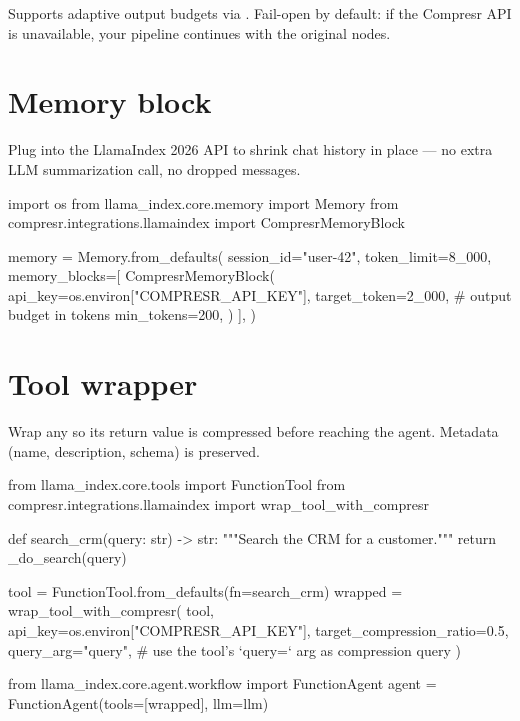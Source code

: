 \documentclass[10pt]{article}
\begin{document}
Supports adaptive output budgets via .
Fail-open by default: if the Compresr API is unavailable, your pipeline
continues with the original nodes.

\section{Memory block}

Plug  into the LlamaIndex 2026
 API to shrink chat history in place — no extra LLM
summarization call, no dropped messages.

\begin{pycode}
import os
from llama_index.core.memory import Memory
from compresr.integrations.llamaindex import CompresrMemoryBlock

memory = Memory.from_defaults(
    session_id="user-42",
    token_limit=8_000,
    memory_blocks=[
        CompresrMemoryBlock(
            api_key=os.environ["COMPRESR_API_KEY"],
            target_token=2_000,     # output budget in tokens
            min_tokens=200,
        )
    ],
)
\end{pycode}

\section{Tool wrapper}

Wrap any  so its return value is compressed
before reaching the agent. Metadata (name, description, schema) is
preserved.

\begin{pycode}
from llama_index.core.tools import FunctionTool
from compresr.integrations.llamaindex import wrap_tool_with_compresr

def search_crm(query: str) -> str:
    """Search the CRM for a customer."""
    return _do_search(query)

tool = FunctionTool.from_defaults(fn=search_crm)
wrapped = wrap_tool_with_compresr(
    tool,
    api_key=os.environ["COMPRESR_API_KEY"],
    target_compression_ratio=0.5,
    query_arg="query",   # use the tool's `query=` arg as compression query
)

from llama_index.core.agent.workflow import FunctionAgent
agent = FunctionAgent(tools=[wrapped], llm=llm)
\end{pycode}
\end{document}
